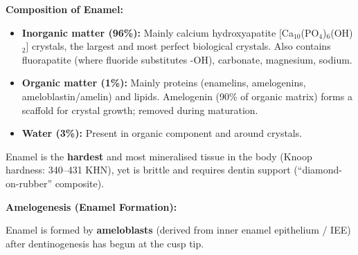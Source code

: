 \documentclass[11pt,a4paper]{article}
\begin{document}
\begin{ansbox}
\textbf{Composition of Enamel:}
\begin{itemize}[leftmargin=*]
    \item \textbf{Inorganic matter (96\%):} Mainly calcium hydroxyapatite [Ca$_{10}$(PO$_4$)$_6$(OH)$_2$] crystals, the largest and most perfect biological crystals. Also contains fluorapatite (where fluoride substitutes -OH), carbonate, magnesium, sodium.
    \item \textbf{Organic matter (1\%):} Mainly proteins (enamelins, amelogenins, ameloblastin/amelin) and lipids. Amelogenin (90\% of organic matrix) forms a scaffold for crystal growth; removed during maturation.
    \item \textbf{Water (3\%):} Present in organic component and around crystals.
\end{itemize}

Enamel is the \textbf{hardest} and most mineralised tissue in the body (Knoop hardness: 340--431 KHN), yet is brittle and requires dentin support (``diamond-on-rubber'' composite).

\textbf{Amelogenesis (Enamel Formation):}

Enamel is formed by \textbf{ameloblasts} (derived from inner enamel epithelium / IEE) after dentinogenesis has begun at the cusp tip.


\end{ansbox}
\end{document}
